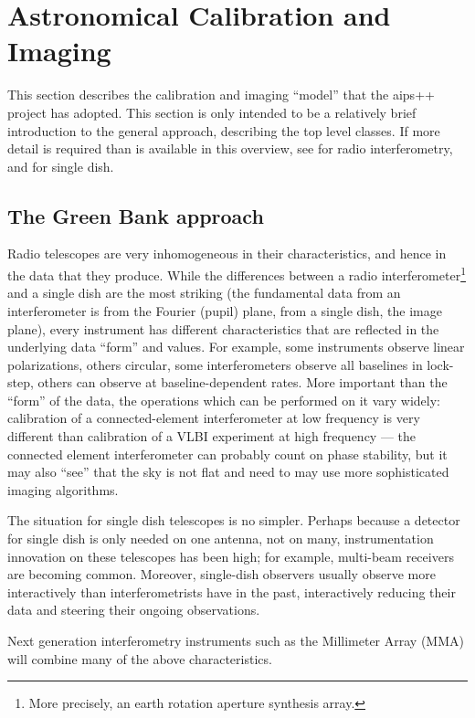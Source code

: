 \section{Astronomical Calibration and Imaging}

This section describes the calibration and imaging ``model'' that the
{\sc aips++} project has adopted. This section is only intended to be
a relatively brief introduction to the general approach, describing
the top level classes. If more detail is required than is available in
this overview, see \cite{noordam:uvci} for radio interferometry, and
\cite{garwood:sdci} for single dish.

\subsection{The Green Bank approach}

Radio telescopes are very inhomogeneous in their characteristics, and
hence in the data that they produce. While the differences between a
radio interferometer\footnote{More precisely, an earth rotation
aperture synthesis array.} and a single dish are the most striking
(the fundamental data from an interferometer is from the Fourier
(pupil) plane, from a single dish, the image plane), every instrument
has different characteristics that are reflected in the underlying
data ``form'' and values.  For example, some instruments observe
linear polarizations, others circular, some interferometers observe
all baselines in lock-step, others can observe at baseline-dependent
rates. More important than the ``form'' of the data, the operations
which can be performed on it vary widely: calibration of a
connected-element interferometer at low frequency is very different
than calibration of a VLBI experiment at high frequency --- the
connected element interferometer can probably count on phase
stability, but it may also ``see'' that the sky is not flat and need
to may use more sophisticated imaging algorithms.

The situation for single dish telescopes is no simpler. Perhaps
because a detector for single dish is only needed on one antenna, not
on many, instrumentation innovation on these telescopes has been high;
for example, multi-beam receivers are becoming common. Moreover,
single-dish observers usually observe more interactively than
interferometrists have in the past, interactively reducing their data
and steering their ongoing observations.

Next generation interferometry instruments such as the Millimeter
Array (MMA) will combine many of the above characteristics.

